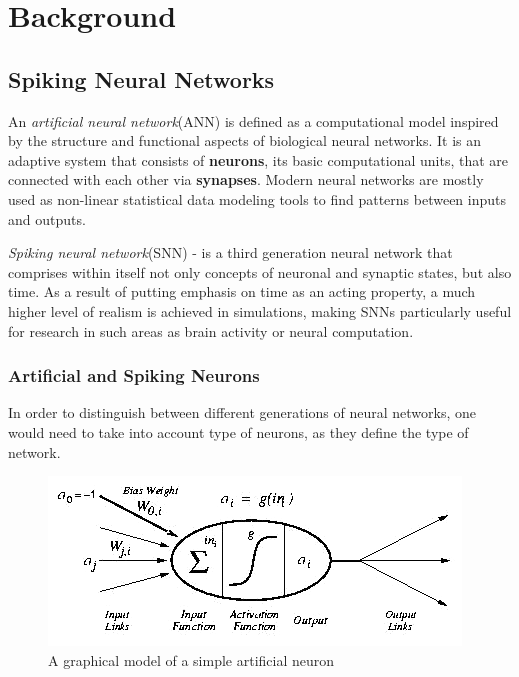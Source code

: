 \chapter{Background}

\section{Spiking Neural Networks}

An \emph{artificial neural network}(ANN) is defined as a computational model inspired by the structure and functional aspects of biological neural networks.\cite{ActFunc}
It is an adaptive system that consists of \textbf{neurons}, its basic computational units, that are connected with each other via \textbf{synapses}.
Modern neural networks are mostly used as non-linear statistical data modeling tools to find patterns between inputs and outputs.\cite{Bar-Yam2003}

\emph{Spiking neural network}(SNN) - is a third generation neural network that comprises within itself not only concepts of neuronal and synaptic states, but 
also time.\cite{Maass1997} As a result of putting emphasis on time as an acting property, a much higher level of realism is achieved in simulations,
making SNNs particularly useful for research in such areas as brain activity or neural computation.

\subsection{Artificial and Spiking Neurons}

In order to distinguish between different generations of neural networks, one would need to take into account type of neurons, as they define the type of network.

\begin{figure}[h]
\begin{center}
\includegraphics[scale = 0.6]{images/neuron_model.png}
\end{center}
\caption{A graphical model of a simple artificial neuron\cite{Philosophy}}
\end{figure}

